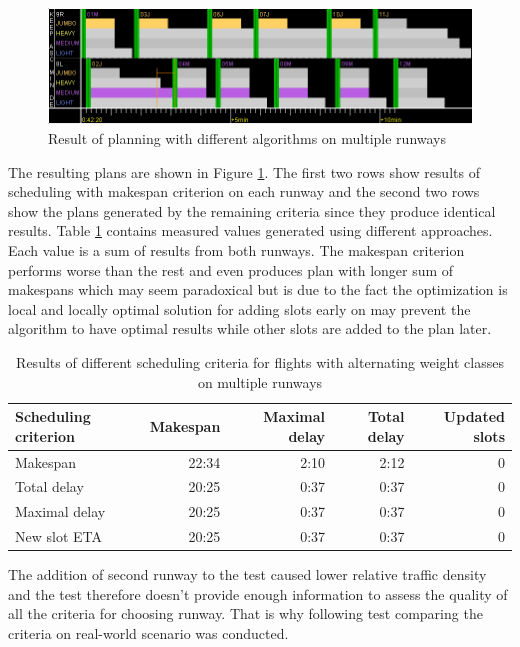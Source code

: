 \begin{figure}[h]
    \centering
    \includegraphics[width=\textwidth]{figures/2rwy-weight.png}
    \caption{Result of planning with different algorithms on multiple runways }
    \label{fig:2rwy-weight}
\end{figure}

The resulting plans are shown in Figure \ref{fig:2rwy-weight}. The first two rows show results of scheduling with makespan criterion on each runway and the second two rows show the plans generated by the remaining criteria since they produce identical results. Table \ref{tab:2rwy-alternating} contains measured values generated using different approaches. Each value is a sum of results from both runways.  The makespan criterion performs worse than the rest and even produces plan with longer sum of makespans which may seem paradoxical but is due to the fact the optimization is local and locally optimal solution for adding slots early on may prevent the algorithm to have optimal results while other slots are added to the plan later. 

\begin{table}[h]
  \centering
\begin{tabular}{|l|r|r|r|r|}
\hline
Scheduling criterion & Makespan  & Maximal delay & Total delay & Updated slots \\
\hline
Makespan      & 22:34  & 2:10 & 2:12 & 0 \\
Total delay   & 20:25  & 0:37 & 0:37 & 0 \\
Maximal delay & 20:25  & 0:37 & 0:37 & 0 \\
New slot ETA  & 20:25  & 0:37 & 0:37 & 0 \\
\hline
\end{tabular}
  \caption{Results of different scheduling criteria for flights with alternating weight classes on multiple runways}
  \label{tab:2rwy-alternating}
\end{table}

The addition of second runway to the test caused lower relative traffic density and the test therefore doesn't provide enough information to assess the quality of all the criteria for choosing runway. That is why following test comparing the criteria on real-world scenario was conducted.

